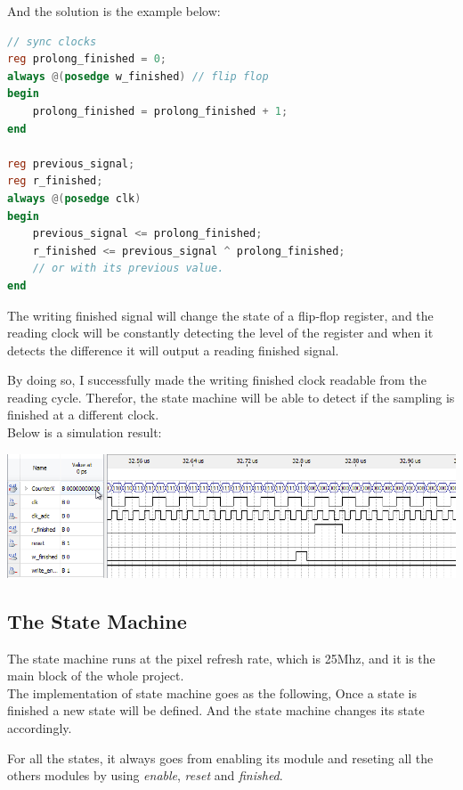 \documentclass[11pt]{scrartcl}
\begin{document}
And the solution is the example below:
\begin{lstlisting}[language=Verilog]
// sync clocks
reg prolong_finished = 0;
always @(posedge w_finished) // flip flop
begin
	prolong_finished = prolong_finished + 1;
end

reg previous_signal;
reg r_finished;
always @(posedge clk) 
begin
	previous_signal <= prolong_finished; 
	r_finished <= previous_signal ^ prolong_finished;
	// or with its previous value.
end
\end{lstlisting}

The writing finished signal will change the state of a flip-flop register, and the reading clock will be constantly detecting the level of the register and when  it detects the difference it will output a reading finished signal.

By doing so, I successfully made the writing finished clock readable from the reading cycle. Therefor, the state machine will be able to detect if the sampling is finished at a different clock.\\


Below is a simulation result:

\begin{minipage}[t]{\linewidth}

{
\includegraphics[scale = 0.5]{dualram.png}
}
\end{minipage}
\medskip

\subsection{The State Machine}
\label{sec:state}
The state machine runs at the pixel refresh rate, which is 25Mhz, and it is the main block of the whole project. \\


The implementation of state machine goes as the following, Once a state is finished a new state will be defined. And the state machine changes its state accordingly. 

For all the states, it always goes from enabling its module and reseting all the others modules by using \textit{enable}, \textit{reset} and \textit{finished}. \\
\end{document}
